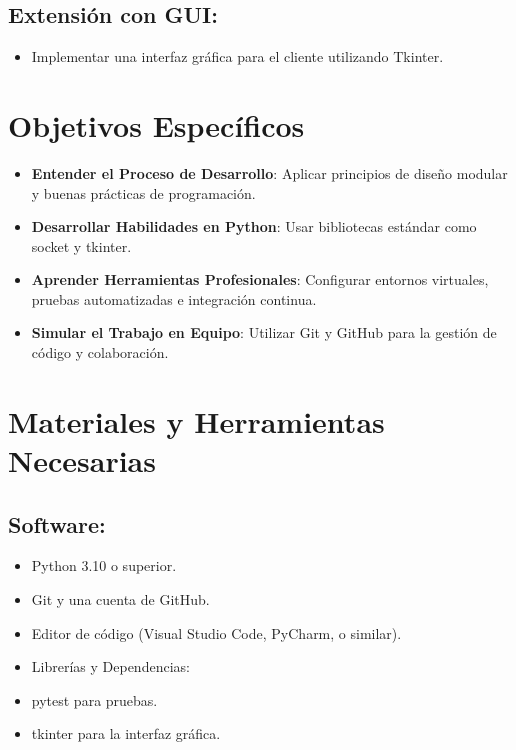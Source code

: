 \documentclass[
  a4paper,
  DIV=11,
  numbers=noendperiod,
  onepage,
  openany]{scrreprt}
\providecommand{\tightlist}{%
  \setlength{\itemsep}{0pt}\setlength{\parskip}{0pt}}\usepackage{longtable,booktabs,array}
\begin{document}
\subsection{Extensión con GUI:}\label{extensiuxf3n-con-gui}

\begin{itemize}
\tightlist
\item
  Implementar una interfaz gráfica para el cliente utilizando Tkinter.
\end{itemize}

\section{Objetivos Específicos}\label{objetivos-especuxedficos}

\begin{itemize}
\tightlist
\item
  \textbf{Entender el Proceso de Desarrollo}: Aplicar principios de
  diseño modular y buenas prácticas de programación.
\item
  \textbf{Desarrollar Habilidades en Python}: Usar bibliotecas estándar
  como socket y tkinter.
\item
  \textbf{Aprender Herramientas Profesionales}: Configurar entornos
  virtuales, pruebas automatizadas e integración continua.
\item
  \textbf{Simular el Trabajo en Equipo}: Utilizar Git y GitHub para la
  gestión de código y colaboración.
\end{itemize}

\section{Materiales y Herramientas
Necesarias}\label{materiales-y-herramientas-necesarias}

\subsection{Software:}\label{software}

\begin{itemize}
\tightlist
\item
  Python 3.10 o superior.
\item
  Git y una cuenta de GitHub.
\item
  Editor de código (Visual Studio Code, PyCharm, o similar).
\item
  Librerías y Dependencias:
\item
  pytest para pruebas.
\item
  tkinter para la interfaz gráfica.
\end{itemize}
\end{document}
